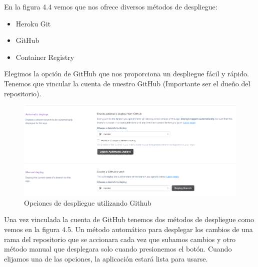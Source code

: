 En la figura 4.4 vemos que nos ofrece diversos métodos de despliegue:
\begin{itemize}
    \item Heroku Git
    \item GitHub
    \item Container Registry
\end{itemize}
Elegimos la opción de GitHub que nos proporciona un despliegue fácil y rápido. Tenemos que vincular la cuenta de nuestro GitHub (Importante ser el dueño del repositorio).
\begin{figure}[H]
    \centering
    \includegraphics[width=6in]{figures/chapter-4/heroku_4.png}
    \caption{Opciones de despliegue utilizando Github}
\end{figure}
Una vez vinculada la cuenta de GitHub tenemos dos métodos de despliegue como vemos en la figura 4.5. Un método automático para desplegar los cambios de una rama del repositorio que se accionara cada vez que subamos cambios y otro método manual que desplegara solo cuando presionemos el botón. 
Cuando elijamos una de las opciones, la aplicación estará lista para usarse.
